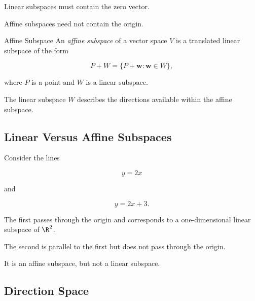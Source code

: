 Linear subspaces must contain the zero vector.

Affine subspaces need not contain the origin.

\begin{definitionbox}{Affine Subspace}
An \emph{affine subspace} of a vector space \(V\) is a translated linear
subspace of the form

\[ \boxed{P+W=\{P+\mathbf{w}:\mathbf{w}\in W\},} \]

where \(P\) is a point and \(W\) is a linear subspace.
\end{definitionbox}

The linear subspace \(W\) describes the directions available within the
affine subspace.

\subsection{Linear Versus Affine Subspaces}
\label{subsec:linear-versus-affine-subspaces}

Consider the lines

\[ y=2x \]

and

\[ y=2x+3. \]

The first passes through the origin and corresponds to a one-dimensional
linear subspace of \(\R^2\).

The second is parallel to the first but does not pass through the origin.

It is an affine subspace, but not a linear subspace.

\begin{centereddiagram}
\end{centereddiagram}

\subsection{Direction Space}
\label{subsec:affine-direction-space}


